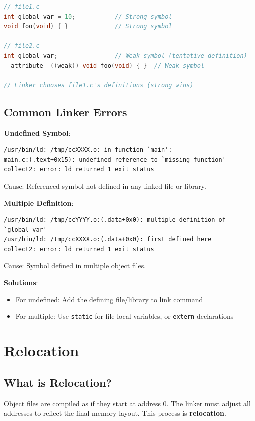 \begin{lstlisting}[language=C]
// file1.c
int global_var = 10;           // Strong symbol
void foo(void) { }             // Strong symbol

// file2.c
int global_var;                // Weak symbol (tentative definition)
__attribute__((weak)) void foo(void) { }  // Weak symbol

// Linker chooses file1.c's definitions (strong wins)
\end{lstlisting}

\subsection{Common Linker Errors}

\textbf{Undefined Symbol}:
\begin{verbatim}
/usr/bin/ld: /tmp/ccXXXX.o: in function `main':
main.c:(.text+0x15): undefined reference to `missing_function'
collect2: error: ld returned 1 exit status
\end{verbatim}

Cause: Referenced symbol not defined in any linked file or library.

\textbf{Multiple Definition}:
\begin{verbatim}
/usr/bin/ld: /tmp/ccYYYY.o:(.data+0x0): multiple definition of `global_var'
/usr/bin/ld: /tmp/ccXXXX.o:(.data+0x0): first defined here
collect2: error: ld returned 1 exit status
\end{verbatim}

Cause: Symbol defined in multiple object files.

\textbf{Solutions}:
\begin{itemize}
    \item For undefined: Add the defining file/library to link command
    \item For multiple: Use \texttt{static} for file-local variables, or \texttt{extern} declarations
\end{itemize}

\section{Relocation}

\subsection{What is Relocation?}

Object files are compiled as if they start at address 0. The linker must adjust all addresses to reflect the final memory layout. This process is \textbf{relocation}.

